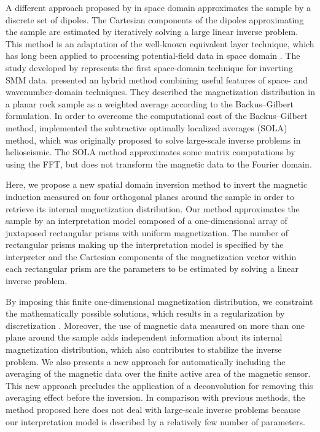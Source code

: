 \documentclass[draft,gc]{agutex}
\begin{document}
\begin{article}
A different approach proposed by \citep{weiss2007} in space domain
approximates the sample by a discrete set of dipoles.
The Cartesian components of the dipoles approximating the sample
are estimated by iteratively solving a large linear inverse problem.
This method is an adaptation of the well-known equivalent
layer technique, which has long been applied to processing
potential-field data in space domain \citep{dampney1969, emilia1973, 
vonfrese-etal1981, hansen-miyazaki1984, silva1986, leao-silva1989, 
cordell1992, mendonca1992, mendonca-silva1994, mendonca-silva1995,
guspi-novara2009, li-oldenburg2010, barnes-lumley2011, 
oliveirajr-etal2013, kara-etal2014, li-nabighian-oldenburg2014,
barnes2014}.
The study developed by \citep{weiss2007} represents the first
space-domain technique for inverting SMM data.
\citet{usui2012} presented an hybrid method combining
useful features of space- and wavenumber-domain techniques.
They described the magnetization distribution in a planar
rock sample as a weighted average according to the 
Backus–Gilbert formulation.
In order to overcome the computational cost of the 
Backus–Gilbert method, \citet{usui2012} implemented 
the subtractive optimally localized averages (SOLA) 
method, which was originally proposed to solve
large-scale inverse problems in helioseismic.
The SOLA method approximates some matrix computations 
by using the FFT, but does not transform the magnetic 
data to the Fourier domain.

Here, we propose a new spatial domain inversion
method to invert the magnetic induction measured on four 
orthogonal planes around the sample in order to retrieve its internal
magnetization distribution. 
Our method approximates the sample by an interpretation model 
composed of a one-dimensional array of juxtaposed rectangular 
prisms with uniform magnetization.
The number of rectangular prisms making 
up the interpretation model is specified by the interpreter and
the Cartesian components of the magnetization vector within 
each rectangular prism are the parameters to be estimated by 
solving a linear inverse problem.

By imposing this finite one-dimensional magnetization distribution, 
we constraint the mathematically possible solutions, which results
in a regularization by discretization \citep{engl1996, aster2005}.
Moreover, the use of magnetic data measured on more than one
plane around the sample adds independent information about
its internal magnetization distribution, which also contributes
to stabilize the inverse problem.
We also presents a new approach for automatically including the
averaging of the magnetic data over the finite active area of
the magnetic sensor.
This new approach precludes the application of a deconvolution
for removing this averaging effect before the inversion.
In comparison with previous methods,
the method proposed here does not deal with large-scale inverse problems 
because our interpretation model is described by a relatively 
few number of parameters.


\end{article}
\end{document}
